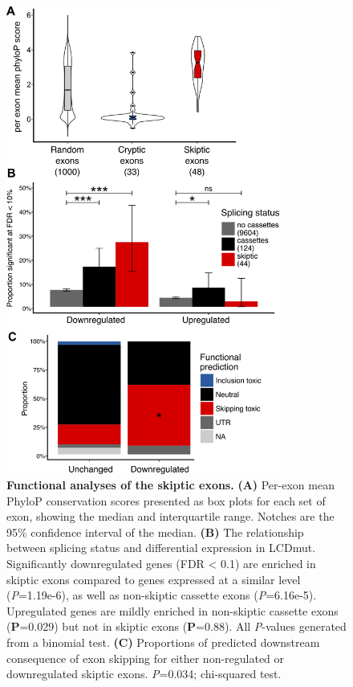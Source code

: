 \begin{figure}[h!]
	\centering
	\includegraphics[width=9cm]{Figures/05_tdp_mice/functional_plots_vertical.png}
	\caption[Functional analyses of the skiptic exons]{
		\textbf{Functional analyses of the skiptic exons.}
	\textbf{(A)} Per-exon mean PhyloP conservation scores presented as box plots for each set of exon, showing the median and interquartile range. Notches are the 95\% confidence interval of the median. 
	\textbf{(B)} The relationship between splicing status and differential expression in LCDmut. Significantly downregulated genes (FDR < 0.1) are enriched in skiptic exons compared to genes expressed at a similar level (\textit{P}=1.19e-6), as well as non-skiptic cassette exons (\textit{P}=6.16e-5). Upregulated genes are mildly enriched in non-skiptic cassette exons (\textbf{P}=0.029) but not in skiptic exons (\textbf{P}=0.88). All \textit{P}-values generated from a binomial test. 
	\textbf{(C)} Proportions of predicted downstream consequence of exon skipping for either non-regulated or downregulated skiptic exons. \textit{P}=0.034; chi-squared test.
}
	\label{fig:functional_plots}
\end{figure}

